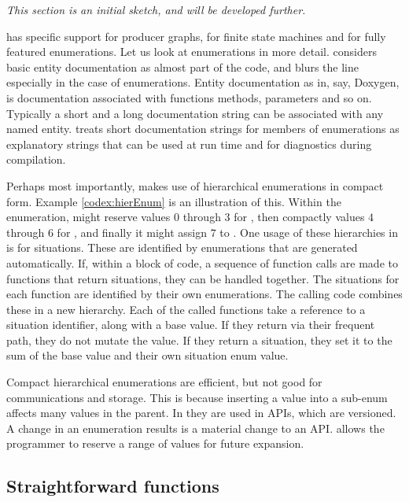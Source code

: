 \documentclass[10pt]{amsart}
\begin{document}
\emph{This section is an initial sketch, and will be developed further.}

\Utop has specific support for producer graphs, for finite state
machines and for fully featured enumerations.  Let us look at
enumerations in more detail.  \Utop considers basic entity
documentation as almost part of the code, and blurs the line
especially in the case of enumerations.  Entity documentation as in,
say, Doxygen, is documentation associated with functions methods,
parameters and so on.  Typically a short and a long documentation
string can be associated with any named entity.  \Utop treats short
documentation strings for members of enumerations as explanatory
strings that can be used at run time and for diagnostics during
compilation.

Perhaps most importantly, \Utop makes use of hierarchical enumerations
in compact form.  Example \ref{codex:hierEnum} is an illustration of
this.  Within the \texttt{} enumeration, \Utop might
reserve values $0$ through $3$ for \texttt{}, then
compactly values $4$ through $6$ for \texttt{}, and
finally it might assign $7$ to \texttt{}.  One usage of
these hierarchies in \Utop is for situations.  These are identified by
enumerations that are generated automatically.  If, within a block of
code, a sequence of function calls are made to functions that return
situations, they can be handled together.  The situations for each
function are identified by their own enumerations.  The calling code
combines these in a new hierarchy.  Each of the called functions take
a reference to a situation identifier, along with a base value.  If
they return via their frequent path, they do not mutate the value.  If
they return a situation, they set it to the sum of the base value and
their own situation enum value.

Compact hierarchical enumerations are efficient, but not good for
communications and storage.  This is because inserting a value into a
sub-enum affects many values in the parent.  In \Utop they are used in
APIs, which are versioned.  A change in an enumeration results is a
material change to an API\@.  \Utop allows the programmer to reserve a
range of values for future expansion.

\subsection{Straightforward functions}
\end{document}
